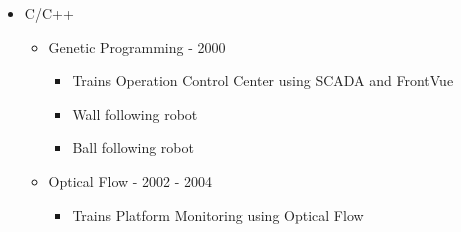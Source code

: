 {\begin{itemize}
    \item C/C++
    \begin{itemize}
        \item Genetic Programming - 2000
        \begin{itemize}
            \item Trains Operation Control Center using SCADA and FrontVue
            \item Wall following robot
            \item Ball following robot
        \end{itemize}
        \item Optical Flow - 2002 - 2004
        \begin{itemize}
            \item Trains Platform Monitoring using Optical Flow
        \end{itemize}
    \end{itemize}
\end{itemize}
}